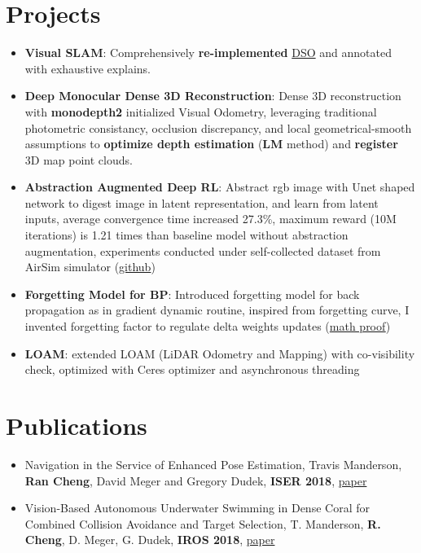 \documentclass[letterpaper,10pt]{article}
\newcommand{\resumeItem}[2]{
  \item\small{
    \textbf{#1}{: #2 \vspace{-2pt}}
  }
}
\newcommand{\resumeSubItem}[2]{\resumeItem{#1}{#2}\vspace{-4pt}}
\newcommand{\resumeSubHeadingListStart}{\begin{itemize}[leftmargin=*]}
\newcommand{\resumeSubHeadingListEnd}{\end{itemize}}
\newcommand{\shorterSection}[1]{\vspace{-10pt}\section{#1}}
\begin{document}
\shorterSection{\textcolor{titleblue}{Projects}}
  \resumeSubHeadingListStart
    \resumeSubItem{Visual SLAM}
     {
     Comprehensively \textbf{re-implemented} \href{https://github.com/rancheng/dso_understands}{\textcolor{linkblue}{DSO}} and annotated with exhaustive explains.
     }
    \resumeSubItem{Deep Monocular Dense 3D Reconstruction}{Dense 3D reconstruction with \textbf{monodepth2} initialized Visual Odometry, leveraging traditional photometric consistancy, occlusion discrepancy, and local geometrical-smooth assumptions to \textbf{optimize depth estimation} (\textbf{LM} method) and \textbf{register} 3D map point clouds.}
    \resumeSubItem{Abstraction Augmented Deep RL}
      {Abstract rgb image with Unet shaped network to digest image in latent representation, and learn from latent inputs, average convergence time increased 27.3\%, maximum reward (10M iterations) is 1.21 times than baseline model without abstraction augmentation, experiments conducted under self-collected dataset from AirSim simulator (\href{https://github.com/rancheng/AirSimProjects}{\textcolor{linkblue}{github}})}
    \resumeSubItem{Forgetting Model for BP}
      {Introduced forgetting model for back propagation as in gradient dynamic routine, inspired from forgetting curve, I invented forgetting factor to regulate delta weights updates (\href{https://rancheng.github.io/forgetting-model/}{\textcolor{linkblue}{math proof}})}
    \resumeSubItem{LOAM}{extended LOAM (LiDAR Odometry and Mapping) with co-visibility check, optimized with Ceres optimizer and asynchronous threading}
  \resumeSubHeadingListEnd

\shorterSection{\textcolor{titleblue}{Publications}}
  \resumeSubHeadingListStart
  \small
        \item{Navigation in the Service of Enhanced Pose Estimation, Travis Manderson, \textbf{Ran Cheng}, David Meger and Gregory Dudek, \textbf{ISER 2018}, \href{http://www.cim.mcgill.ca/~travism/authors/ran-cheng/}{\textcolor{linkblue}{paper}}}
        \vspace{-5pt}
        \item{Vision-Based Autonomous Underwater Swimming in Dense Coral for Combined Collision Avoidance and Target Selection, T. Manderson, \textbf{R. Cheng}, D. Meger, G. Dudek, \textbf{IROS 2018}, \href{http://www.cim.mcgill.ca/~travism/authors/ran-cheng/}{\textcolor{linkblue}{paper}}}
  \resumeSubHeadingListEnd
\end{document}
